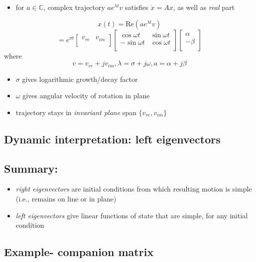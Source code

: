 \documentclass[10pt,letterpaper]{article}
\begin{document}
\begin{itemize}
\item for $a \in \mathbb C$, complex trajectory $a e ^{\lambda t} v$ satisfies $\dot x = Ax$, as well as \emph{real} part
\end{itemize}
$$
x(t) = \text{Re}(ae ^{\lambda t} v)
$$
$$
= e ^{\sigma t}
\begin{bmatrix}
  v _{re} & v _{im} \\
\end{bmatrix}
\begin{bmatrix}
  \cos \omega t  & \sin \omega t \\
  -\sin \omega t & \cos \omega t \\
\end{bmatrix}
\begin{bmatrix}
  \alpha \\
  -\beta \\
\end{bmatrix}
$$ 
where
$$
v= v _{re} + jv _{im} , \lambda = \sigma + j \omega, a = \alpha + j \beta
$$ 
\begin{itemize}
\item $\sigma$ gives logarithmic growth/decay factor
\item $\omega$ gives angular velocity of rotation in plane
\item trajectory stays in \emph{invariant plane} span $\{v _{re} ,v _{im}\}$
\end{itemize}
\subsection{Dynamic interpretation: left eigenvectors}
\label{sec-10_7}
\subsection{Summary:}
\label{sec-10_8}

\begin{itemize}
\item \emph{right eigenvectors} are initial conditions from which resulting motion is simple (i.e., remains on line or in plane)
\item \emph{left eigenvectors} give linear functions of state that are simple, for any initial condition
\end{itemize}
\subsection{Example- companion matrix}
\label{sec-10_9}
\end{document}
